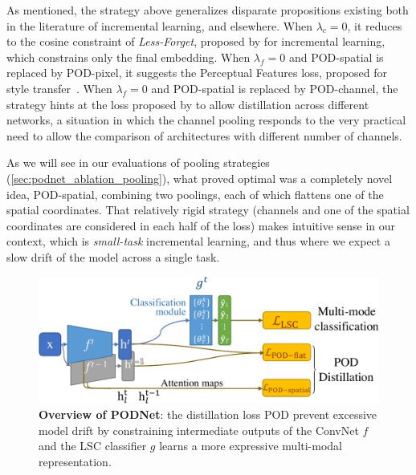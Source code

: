 As mentioned, the strategy above generalizes disparate propositions existing both in the literature
of incremental learning, and elsewhere. When $\lambda_{c}=0$, it reduces to the cosine constraint of
\textit{Less-Forget}, proposed by \citet{hou2019ucir} for incremental learning, which constrains
only the final embedding. When $\lambda_{f}=0$ and POD-spatial is replaced by POD-pixel, it suggests
the Perceptual Features loss, proposed for style transfer~\citep{johnson2016perceptual_losses}. When
$\lambda_{f}=0$ and POD-spatial is replaced by POD-channel, the strategy hints at the loss proposed
by \citet{zagoruyko2016distillation_attention} to allow distillation across different networks, a
situation in which the channel pooling responds to the very practical need to allow the comparison
of architectures with different number of channels.

As we will see in our evaluations of pooling strategies (\autoref{sec:podnet_ablation_pooling}),
what proved optimal was a completely novel idea, POD-spatial, combining two poolings, each of which
flattens one of the spatial coordinates. That relatively rigid strategy (channels and one of the
spatial coordinates are considered in each half of the loss) makes intuitive sense in our context,
which is \textit{small-task} incremental learning, and thus where we expect a slow drift of the
model across a single task.


\begin{figure}[t]
    \begin{center}
        \includegraphics[width=0.8\linewidth]{images/podnet/model}
    \end{center}
    \caption{\textbf{Overview of PODNet}: the distillation loss \ac{POD} prevent excessive model
        drift by constraining intermediate outputs of the \ac{ConvNet} $f$ and the \ac{LSC}
        classifier $g$ learns a more expressive multi-modal representation.}
    \label{fig:podnet_model}
\end{figure}

